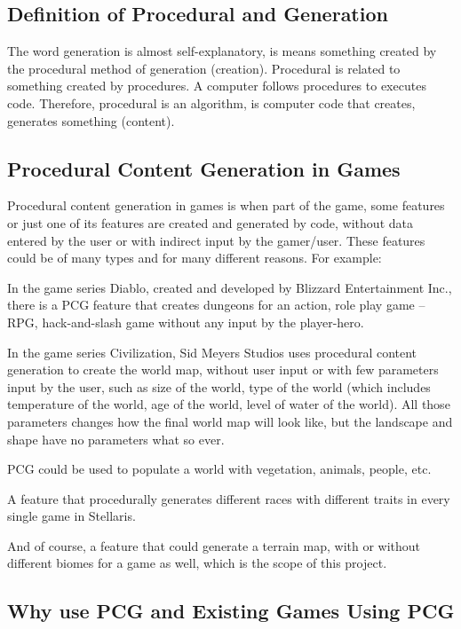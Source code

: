 \documentclass[a4paper,12pt]{book}
\begin{document}
\subsection{Definition of Procedural and Generation}
\label{sub:DOPAG}

The word generation is almost self-explanatory, is means something created by the procedural method of generation (creation). Procedural is related to something created by procedures. A computer follows procedures to executes code. Therefore, procedural is an algorithm, is computer code that creates, generates something (content).


\subsection{Procedural Content Generation in Games}
\label{sub:PCGIG}

Procedural content generation in games is when part of the game, some features or just one of its features are created and generated by code, without data entered by the user or with indirect input by the gamer/user.
These features could be of many types and for many different reasons. For example:

In the game series Diablo, created and developed by Blizzard Entertainment Inc., there is a PCG feature that creates dungeons for an action, role play game – RPG, hack-and-slash game without any input by the player-hero.

In the game series Civilization, Sid Meyers Studios uses procedural content generation to create the world map, without user input or with few parameters input by the user, such as size of the world, type of the world (which includes temperature of the world, age of the world, level of water of the world). All those parameters changes how the final world map will look like, but the landscape and shape have no parameters what so ever.

PCG could be used to populate a world with vegetation, animals, people, etc.

A feature that procedurally generates different races with different traits in every single game in Stellaris.

And of course, a feature that could generate a terrain map, with or without different biomes for a game as well, which is the scope of this project.


\subsection{Why use PCG and Existing Games Using PCG}
\label{sub:WUPAEGUP}
\end{document}

